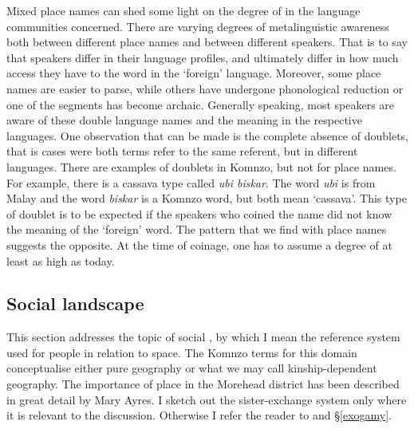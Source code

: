 Mixed place names can shed some light on the degree of  in the language communities concerned. There are varying degrees of metalinguistic awareness both between different place names and between different speakers. That is to say that speakers differ in their language profiles, and ultimately differ in how much access they have to the word in the `foreign' language. Moreover, some place names are easier to parse, while others have undergone phonological reduction or one of the segments has become archaic. Generally speaking, most speakers are aware of these double language names and the meaning in the respective languages. One observation that can be made is the complete absence of doublets, that is cases were both terms refer to the same referent, but in different languages. There are examples of doublets in Komnzo, but not for place names. For example, there is a cassava type called \emph{ubi biskar}. The word \emph{ubi} is from Malay and the word \emph{biskar} is a Komnzo word, but both mean `cassava'. This type of doublet is to be expected if the speakers who coined the name did not know the meaning of the `foreign' word. The pattern that we find with place names suggests the opposite. At the time of coinage, one has to assume a degree of  at least as high as today.

\subsection{Social landscape}\label{sociallandscape}

This section addresses the topic of social , by which I mean the reference system used for people in relation to space. The Komnzo terms for this domain conceptualise either pure geography or what we may call kinship-dependent geography. The importance of place in the Morehead district has been described in great detail by Mary Ayres. I sketch out the sister-exchange system only where it is relevant to the discussion. Otherwise I refer the reader to \citep{Ayres:ws} and \S\ref{exogamy}.\\

